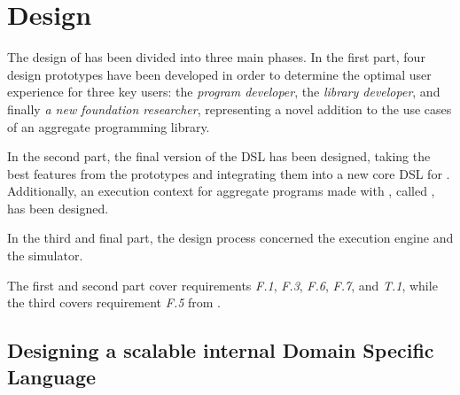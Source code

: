 \chapter{Design}
\label{chap:design}
The design of \this has been divided into three main phases.
%
In the first part, four design prototypes have been developed in order to determine the optimal user experience for three key users: the \textit{program developer}, the \textit{library developer}, and finally \textit{a new foundation researcher}, representing a novel addition to the use cases of an aggregate programming library.

In the second part, the final version of the \ac{DSL} has been designed, taking the best features from the prototypes and integrating them into a new core \ac{DSL} for \this.
%
Additionally, an execution context for aggregate programs made with \this, called , has been designed.

In the third and final part, the design process concerned the execution engine and the simulator.

The first and second part cover requirements \textit{F.1}, \textit{F.3}, \textit{F.6}, \textit{F.7}, and \textit{T.1}, while the third covers requirement \textit{F.5} from .

\section{Designing a scalable internal Domain Specific Language} \label{chap:design->sec:dsl}

